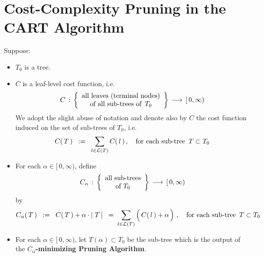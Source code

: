 
\section{Cost-Complexity Pruning in the CART Algorithm}
\setcounter{theorem}{0}


\begin{proposition}
\mbox{}
\vskip 0.1cm
\noindent
Suppose:
\begin{itemize}
\item
	$T_{0}$ is a tree.
\item
	$C$ is a leaf-level cost function, i.e.
	\begin{equation*}
	C \,:\,
	\left\{\begin{array}{c}
		\textnormal{all leaves (terminal nodes)}
		\\
		\textnormal{of all sub-trees of \,$T_{0}$}
		\end{array}\right\}
	\,\longrightarrow\,
	[\,0,\infty)
	\end{equation*}
	We adopt the slight abuse of notation and denote also by $C$
	the cost function induced on the set of sub-trees of $T_{0}$, i.e.
	\begin{equation*}
	C(\,T\,)
	\;\; := \;\;
		\underset{l \in \mathcal{L}(T)}{\sum}\, C(\,l\,)\,,
	\quad
	\textnormal{for each sub-tree \,$T \subset T_{0}$}
	\end{equation*}
\item
	For each $\alpha \in [\,0,\infty)$, define 
	\begin{equation*}
	C_{\alpha} \,:\, \left\{\begin{array}{c} \textnormal{all sub-trees} \\ \textnormal{of $T_{0}$} \end{array}\right\}
	\,\longrightarrow\,
	[\,0,\infty)
	\end{equation*}
	by
	\begin{equation*}
	C_{\alpha}(\,T\,)
	\;\; := \;\;
		C(\,T\,) + \alpha \cdot \vert\;T\,\vert
	\;\; = \;
		\underset{l \in \mathcal{L}(T)}{\sum}\left(\,C(\,l\,) \overset{{\color{white}.}}{+} \alpha\,\right)\,,
	\quad
	\textnormal{for each sub-tree \,$T \subset T_{0}$}
	\end{equation*}
\item
	For each $\alpha \in [\,0,\infty)$, let $T(\alpha) \subset T_{0}$ be the sub-tree
	which is the output of the \textbf{$C_{\alpha}$-minimizing Pruning Algorithm}.
\end{itemize}

\end{proposition}

